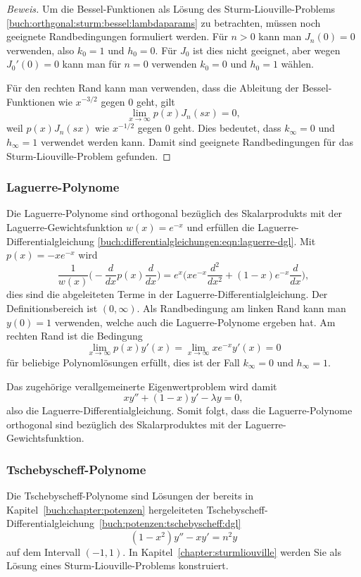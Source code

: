 \begin{proof}[Beweis]
Um die Bessel-Funktionen als Lösung des Sturm-Liouville-Problems
\eqref{buch:orthgonal:sturm:bessel:lambdaparams}
zu betrachten, müssen noch geeignete Randbedingungen formuliert werden.
Für $n>0$ kann man 
$J_n(0)=0$ verwenden, also $k_0=1$ und $h_0=0$.
Für $J_0$ ist dies nicht geeignet, aber wegen $J_0'(0)=0$ kann
man für $n=0$ verwenden $k_0=0$ und $h_0=1$ wählen.

Für den rechten Rand kann man verwenden, dass die Ableitung der
Bessel-Funktionen wie $x^{-3/2}$ gegen $0$ geht, gilt
\[
\lim_{x\to\infty} p(x) J_n(sx) = 0,
\]
weil $p(x)J_n(sx)$ wie $x^{-1/2}$ gegen $0$ geht.
Dies bedeutet, dass $k_\infty=0$ und $h_\infty=1$
verwendet werden kann.
Damit sind geeignete Randbedingungen für das Sturm-Liouville-Problem
gefunden.
\end{proof}

%
%
\subsubsection{Laguerre-Polynome}
Die Laguerre-Polynome sind orthogonal bezüglich des Skalarprodukts
mit der Laguerre-Gewichtsfunktion $w(x)=e^{-x}$ und erfüllen die
Laguerre-Differentialgleichung
\eqref{buch:differentialgleichungen:eqn:laguerre-dgl}.
Mit $p(x)=-xe^{-x}$ wird 
\[
\frac{1}{w(x)}
\biggl(
-
\frac{d}{dx} p(x) \frac{d}{dx}
\biggr)
=
e^x \biggl(xe^{-x}\frac{d^2}{dx^2} + (1-x)e^{-x}\frac{d}{dx}\biggr),
\]
dies sind die abgeleiteten Terme in der Laguerre-Differentialgleichung.
Der Definitionsbereich ist $(0,\infty)$.
Als Randbedingung am linken Rand kann man $y(0)=1$ verwenden, welche
auch die Laguerre-Polynome ergeben hat.
Am rechten Rand ist die Bedingung
\[
\lim_{x\to\infty} p(x)y'(x)
=
\lim_{x\to\infty} xe^{-x} y'(x)
=
0
\]
für beliebige Polynomlösungen erfüllt, dies ist der Fall
$k_{\infty}=0$ und $h_\infty=1$.

Das zugehörige verallgemeinerte Eigenwertproblem  wird damit
\[
xy'' + (1-x)y' - \lambda y = 0,
\]
also die Laguerre-Differentialgleichung.
Somit folgt, dass die Laguerre-Polynome orthogonal sind bezüglich
des Skalarproduktes mit der Laguerre-Gewichtsfunktion.

%
%
\subsubsection{Tschebyscheff-Polynome}
Die Tschebyscheff-Polynome sind Lösungen der
bereits in Kapitel~\ref{buch:chapter:potenzen} hergeleiteten
Tschebyscheff-Differentialgleichung~\eqref{buch:potenzen:tschebyscheff:dgl}
%
%
\[
(1-x^2)y'' -xy' = n^2y
\]
auf dem Intervall $(-1,1)$.
In Kapitel~\ref{chapter:sturmliouville} werden Sie als Lösung
eines Sturm-Liouville-Problems konstruiert.

